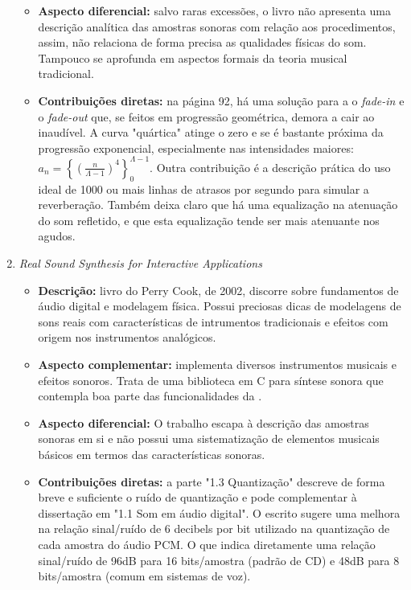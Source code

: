 \begin{enumerate}
\begin{itemize}
            \item {\bf Aspecto diferencial:} salvo raras excessões, o livro não apresenta uma descrição analítica das amostras sonoras com relação aos procedimentos, assim, não relaciona de forma precisa as qualidades físicas do som. Tampouco se aprofunda em aspectos formais da teoria musical tradicional.
            \item {\bf Contribuições diretas:} na página 92, há uma solução para a o \emph{fade-in} e o \emph{fade-out} que, se feitos em progressão geométrica, demora a cair ao inaudível. A curva "quártica" atinge o zero e se é bastante próxima da progressão exponencial, especialmente nas intensidades maiores: $a_n = \left\{\left(\frac{n}{\Lambda-1}\right)^4\right\}_0^{\Lambda-1}$. Outra contribuição é a descrição prática do uso ideal de 1000 ou mais linhas de atrasos por segundo para simular a reverberação. Também deixa claro que há uma equalização na atenuação do som refletido, e que esta equalização tende ser mais atenuante nos agudos.
        \end{itemize}
    \item \emph{Real Sound Synthesis for Interactive Applications}
        \begin{itemize}
            \item {\bf Descrição:} livro do Perry Cook, de 2002, discorre sobre fundamentos de áudio digital e modelagem física. Possui preciosas dicas de modelagens de sons reais com características de intrumentos tradicionais e efeitos com origem nos instrumentos analógicos.
            \item {\bf Aspecto complementar:} implementa diversos instrumentos musicais e efeitos sonoros. Trata de uma biblioteca em C para síntese sonora que contempla boa parte das funcionalidades da \massa.
            \item {\bf Aspecto diferencial:} O trabalho escapa à descrição das amostras sonoras em si e não possui uma sistematização de elementos musicais básicos em termos das características sonoras.
            \item {\bf Contribuições diretas:}  a parte "1.3 Quantização" descreve de forma breve e suficiente o ruído de quantização e pode complementar à dissertação em "1.1 Som em áudio digital". O escrito sugere uma melhora na relação sinal/ruído de 6 decibels por bit utilizado na quantização de cada amostra do áudio PCM. O que indica diretamente uma relação sinal/ruído de 96dB para 16 bits/amostra (padrão de CD) e 48dB para 8 bits/amostra (comum em sistemas de voz).
        \end{itemize}

\end{enumerate}
